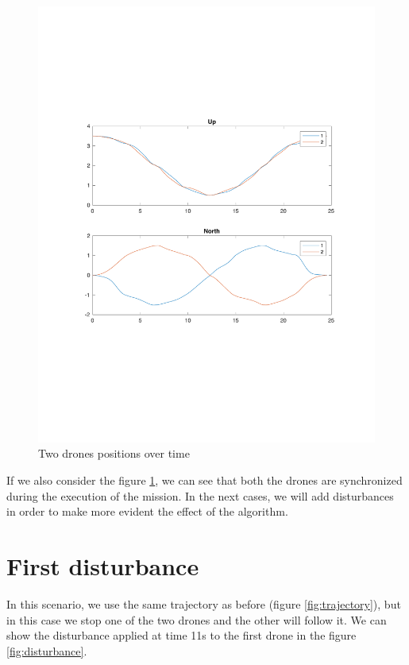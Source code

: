 \begin{figure}[h]
\centering
\includegraphics[width=1.0\textwidth]{chapters/chapter-04/figures/overlapped.pdf}
\caption{Two drones positions over time}
\label{fig:overlapped}
\end{figure}

If we also consider the figure \ref{fig:overlapped}, we can see that both the drones
are synchronized during the execution of the mission. In the next cases, we will
add disturbances in order to make more evident the effect of the algorithm.


\section{First disturbance}
In this scenario, we use the same trajectory as before (figure \ref{fig:trajectory}),
but in this case we stop one of the two drones and the other will follow it.
We can show the disturbance applied at time 11s to the first drone in the figure \ref{fig:disturbance}.

